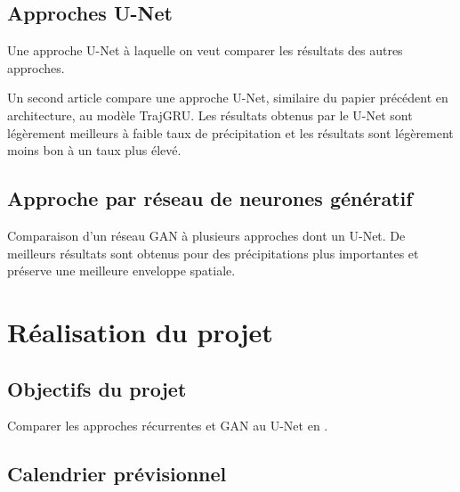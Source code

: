 \documentclass[11pt,a4paper,french]{article}
\begin{document}
\subsection{Approches U-Net}

Une approche U-Net à laquelle on veut comparer les résultats des autres approches. \cite{bouget:hal-03112093} \newline

Un second article compare une approche U-Net, similaire du papier précédent en architecture, au modèle TrajGRU. Les résultats obtenus par le U-Net sont légèrement meilleurs à faible taux de précipitation et les résultats sont légèrement moins bon à un taux plus élevé. \cite{9508500}

\subsection{Approche par réseau de neurones génératif}

Comparaison d'un réseau GAN à plusieurs approches dont un U-Net. De meilleurs résultats sont obtenus pour des précipitations plus importantes et préserve une meilleure enveloppe spatiale. \cite{ravuri2021skillful}

\section{Réalisation du projet}

\subsection{Objectifs du projet}

Comparer les approches récurrentes et GAN au U-Net en \cite{bouget:hal-03112093}.

\subsection{Calendrier prévisionnel}

\newpage

\printbibliography[title=Références]
\end{document}

